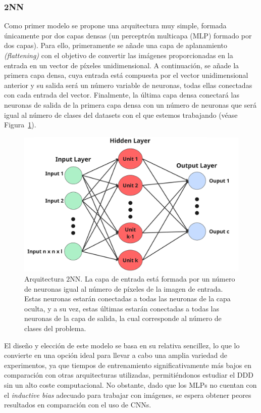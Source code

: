 \subsubsection{2NN}\label{subsubsec:2NN}

Como primer modelo se propone una arquitectura muy simple, formada únicamente por dos capas densas (un perceptrón multicapa (MLP) formado por dos capas). Para ello, primeramente se añade una capa de aplanamiento \textit{(flattening)} con el objetivo de convertir las imágenes proporcionadas en la entrada en un vector de píxeles unidimensional. A continuación, se añade la primera capa densa, cuya entrada está compuesta por el vector unidimensional anterior y su salida será un número variable de neuronas, todas ellas conectadas con cada entrada del vector. Finalmente, la última capa densa conectará las neuronas de salida de la primera capa densa con un número de neuronas que será igual al número de clases del datasets con el que estemos trabajando (véase Figura~\ref{fig:arquitecura2nn}).

\begin{figure}[h]
    \centering
    \includegraphics[width=0.6\linewidth]{img/arquitectura2nn.png}
    \caption[Arquitectura $2$NN.]{Arquitectura $2$NN. La capa de entrada está formada por un número de neuronas igual al número de píxeles de la imagen de entrada. Estas neuronas estarán conectadas a todas las neuronas de la capa oculta, y a su vez, estas últimas estarán conectadas a todas las neuronas de la capa de salida, la cual corresponde al número de clases del problema.}\label{fig:arquitecura2nn}
\end{figure}

El diseño y elección de este modelo se basa en su relativa sencillez, lo que lo convierte en una opción ideal para llevar a cabo una amplia variedad de experimentos, ya que tiempos de entrenamiento significativamente más bajos en comparación con otras arquitecturas utilizadas, permitiéndonos estudiar el DDD sin un alto coste computacional. No obstante, dado que los MLPs no cuentan con el \textit{inductive bias} adecuado para trabajar con imágenes, se espera obtener peores resultados en comparación con el uso de CNNs.

